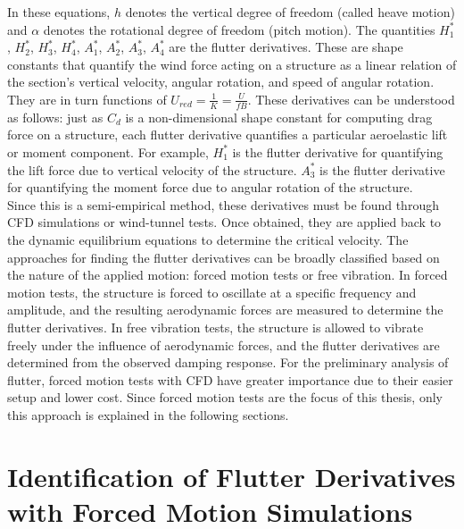 \documentclass[../main]{subfiles}
\begin{document}
In these equations, \(h\) denotes the vertical degree of freedom (called heave motion) and \(\alpha\) denotes the rotational degree of freedom (pitch motion). 
The quantities \(H_1^*\), \(H_2^*\), \(H_3^*\), \(H_4^*\), \(A_1^*\), \(A_2^*\), \(A_3^*\), \(A_4^*\) are the flutter derivatives.
These are shape constants that quantify the wind force acting on a structure as a linear relation 
of the section's vertical velocity, angular rotation, and speed of angular rotation. They are in turn functions 
of \(U_{red} = \frac{1}{K} = \frac{U}{fB}\). These derivatives can be understood as follows: just as \(C_d\) is a non-dimensional shape constant for computing drag force on a structure, 
each flutter derivative quantifies a particular aeroelastic lift or moment component. For example, 
\(H_1^*\) is the flutter derivative for quantifying the lift force due to vertical velocity of the structure. \(A_3^*\) is 
the flutter derivative for quantifying the moment force due to angular rotation of the structure. \\

Since this is a semi-empirical method, these derivatives must be found through CFD simulations or wind-tunnel tests. 
Once obtained, they are applied back to the dynamic equilibrium equations to determine the critical velocity.
The approaches for finding the flutter derivatives can be broadly classified based on 
the nature of the applied motion: forced motion tests or free vibration. In forced motion tests, the structure is forced to 
oscillate at a specific frequency and amplitude, and the resulting aerodynamic forces are measured to determine the flutter derivatives.
In free vibration tests, the structure is allowed to vibrate freely under the influence of aerodynamic forces, 
and the flutter derivatives are determined from the observed damping response.
For the preliminary analysis of flutter, forced motion tests with CFD have greater 
importance due to their easier setup and lower cost. Since forced motion tests are the focus of this thesis, only this approach is 
explained in the following sections. \\

\section{Identification of Flutter Derivatives with Forced Motion Simulations}
\label{section: Identification of Flutter Derivatives with Forced Motion Simulations}
\end{document}
